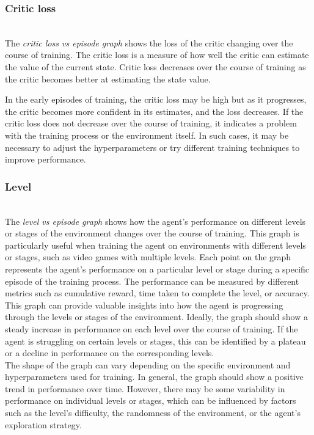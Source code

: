 \documentclass[preprint,12pt]{elsarticle}
\begin{document}
\subsubsection{Critic loss}\\
The \textit{critic loss vs episode graph} shows the loss of the critic changing over the course of training. The critic loss is a measure of how well the critic can estimate the value of the current state. Critic loss decreases over the course of training as the critic becomes better at estimating the state value. 

In the early episodes of training, the critic loss may be high but as it progresses, the critic becomes more confident in its estimates, and the loss decreases. If the critic loss does not decrease over the course of training, it indicates a problem with the training process or the environment itself. In such cases, it may be necessary to adjust the hyperparameters or try different training techniques to improve performance.\\

\subsubsection{Level}\\
The \textit{level vs episode graph} shows how the agent's performance on different levels or stages of the environment changes over the course of training. This graph is particularly useful when training the agent on environments with different levels or stages, such as video games with multiple levels. Each point on the graph represents the agent's performance on a particular level or stage during a specific episode of the training process. The performance can be measured by different metrics such as cumulative reward, time taken to complete the level, or accuracy.\\
This graph can provide valuable insights into how the agent is progressing through the levels or stages of the environment. Ideally, the graph should show a steady increase in performance on each level over the course of training. If the agent is struggling on certain levels or stages, this can be identified by a plateau or a decline in performance on the corresponding levels.\\
The shape of the graph can vary depending on the specific environment and hyperparameters used for training. In general, the graph should show a positive trend in performance over time. However, there may be some variability in performance on individual levels or stages, which can be influenced by factors such as the level's difficulty, the randomness of the environment, or the agent's exploration strategy.\\
\end{document}
